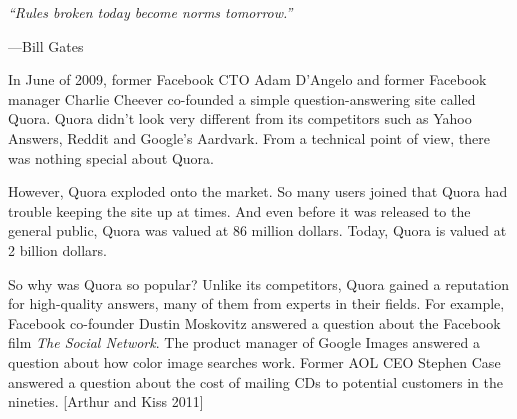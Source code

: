 \documentclass[class=book, crop=false]{standalone}
\begin{document}
\epigraph{\itshape “Rules broken today become norms tomorrow.”}{---Bill Gates}

In June of 2009, former Facebook CTO Adam D'Angelo and former Facebook manager Charlie Cheever co-founded a simple question-answering site called Quora. Quora didn't look very different from its competitors such as Yahoo Answers, Reddit and Google's Aardvark. From a technical point of view, there was nothing special about Quora.

However, Quora exploded onto the market. So many users joined that Quora had trouble keeping the site up at times. And even before it was released to the general public, Quora was valued at 86 million dollars. Today, Quora is valued at 2 billion dollars.

So why was Quora so popular? Unlike its competitors, Quora gained a reputation for high-quality answers, many of them from experts in their fields. For example, Facebook co-founder Dustin Moskovitz answered a question about the Facebook film \textit{The Social Network}. The product manager of Google Images answered a question about how color image searches work. Former AOL CEO Stephen Case answered a question about the cost of mailing CDs to potential customers in the nineties. [Arthur and Kiss 2011]
\end{document}
